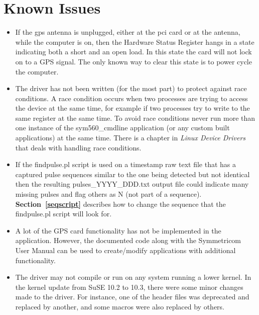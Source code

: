 \documentclass[11pt]{article}
\begin{document}


    \section{Known Issues} \label{issues}

    \begin{itemize}
        \item If the gps antenna is unplugged, either at the pci card or at the antenna, while the computer is on, then the Hardware Status Register hangs in a state indicating both a short and an open load. In this state the card will not lock on to a GPS signal. The only known way to clear this state is to power cycle the computer.

        \item The driver has not been written (for the most part) to protect against race conditions. A race condition occurs when two processes are trying to access the device at the same time, for example if two processes try to write to the same register at the same time. To avoid race conditions never run more than one instance of the sym560\_cmdline application (or any custom built applications) at the same time. There is a chapter in \textit{Linux Device Drivers} that deals with handling race conditions.

        \item If the findpulse.pl script is used on a timestamp raw text file that has a captured pulse sequences similar to the one being detected but not identical then the resulting pulses\_YYYY\_DDD.txt output file could indicate many missing pulses and flag others as N (not part of a sequence).  \textbf{Section~\ref{seqscript}} describes how to change the sequence that the findpulse.pl script will look for.

        \item A lot of the GPS card functionality has not be implemented in the application. However, the documented code along with the Symmetricom User Manual can be used to create/modify applications with additional functionality.

        \item The driver may not compile or run on any system running a lower kernel. In the kernel update from SuSE 10.2 to 10.3, there were some minor changes made to the driver. For instance, one of the header files was deprecated and replaced by another, and some macros were also replaced by others.
    \end{itemize}
\end{document}
